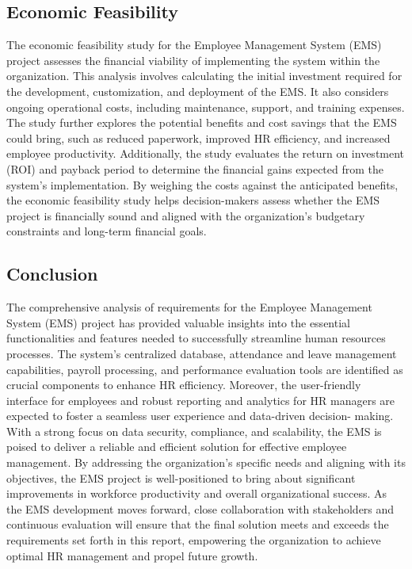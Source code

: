 \subsection{Economic Feasibility}
The economic feasibility study for the Employee Management System (EMS) project assesses the
financial viability of implementing the system within the organization. This analysis involves
calculating the initial investment required for the development, customization, and deployment
of the EMS. It also considers ongoing operational costs, including maintenance, support, and
training expenses. The study further explores the potential benefits and cost savings that the
EMS could bring, such as reduced paperwork, improved HR efficiency, and increased employee
productivity. Additionally, the study evaluates the return on investment (ROI) and payback
period to determine the financial gains expected from the system's implementation. By weighing
the costs against the anticipated benefits, the economic feasibility study helps decision-makers
assess whether the EMS project is financially sound and aligned with the organization's
budgetary constraints and long-term financial goals.
\subsection{Conclusion}
The comprehensive analysis of requirements for the Employee Management System (EMS)
project has provided valuable insights into the essential functionalities and features needed
to successfully streamline human resources processes. The system's centralized database,
attendance and leave management capabilities, payroll processing, and performance
evaluation tools are identified as crucial components to enhance HR efficiency. Moreover,
the user-friendly interface for employees and robust reporting and analytics for HR
managers are expected to foster a seamless user experience and data-driven decision-
making. With a strong focus on data security, compliance, and scalability, the EMS is poised
to deliver a reliable and efficient solution for effective employee management. By
addressing the organization's specific needs and aligning with its objectives, the EMS
project is well-positioned to bring about significant improvements in workforce
productivity and overall organizational success. As the EMS development moves forward,
close collaboration with stakeholders and continuous evaluation will ensure that the final
solution meets and exceeds the requirements set forth in this report, empowering the
organization to achieve optimal HR management and propel future growth.